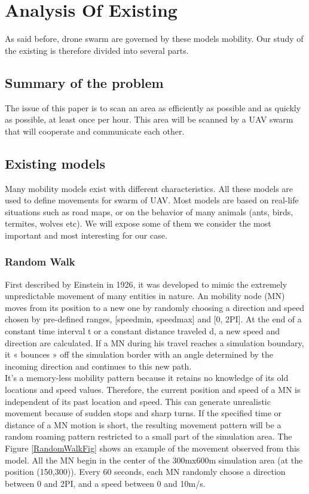 \chapter{Analysis Of Existing}

As said before, drone swarm are governed by these models mobility. Our study of the existing is therefore divided into several parts.

\section{Summary of the problem}

The issue of this paper is to scan an area as efficiently as possible and as quickly as possible, at least once per hour. This area will be scanned by a UAV swarm that will cooperate and communicate each other.

\section{Existing models}

Many mobility models exist with different characteristics. All these models are used to define movements for swarm of UAV. Most models are based on real-life situations such as road maps, or on the behavior of many animals (ants, birds, termites, wolves etc). We will expose some of them we consider the most important and most interesting for our case.

\newpage

\subsection{Random Walk}

First described by Einstein in 1926, it was developed to mimic the extremely unpredictable movement of many entities in nature. An mobility node (MN) moves from its position to a new one by randomly choosing a direction and speed chosen by pre-defined ranges, [speedmin, speedmax] and [0, 2PI]. At the end of a constant time interval t or a constant distance traveled d, a new speed and direction are calculated. If a MN during his travel reaches a simulation boundary, it « bounces » off the simulation border with an angle determined by the incoming direction and continues to this new path.\\
It's a memory-less mobility pattern because it retains no knowledge of its old locations and speed values. Therefore, the current position and speed of a MN is independent of its past location and speed. This can generate unrealistic movement because of sudden stops and sharp turns. If the specified time or distance of a MN motion is short, the resulting movement pattern will be a random roaming pattern restricted to a small part of the simulation area. The Figure \ref{RandomWalkFig} shows an example of the movement observed from this model. All the MN begin in the center of the 300mx600m simulation area (at the position (150,300)). Every 60 seconds, each MN randomly choose a direction between 0 and 2PI, and a speed between 0 and 10m/s.\\

